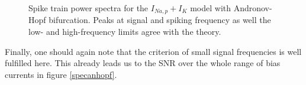 \documentclass[12pt,a4paper]{article}
\begin{document}
\begin{figure}[H]
	\label{anhopfspec}
	\hspace*{-0.5cm}
	\caption{Spike train power spectra for the $I_{Na,p}+I_K$ model with Andronov-Hopf bifurcation. Peaks at signal and spiking frequency as well the low- and high-frequency limits agree with the theory.}
\end{figure}
Finally, one should again note that the criterion of small signal frequencies is well fulfilled here. This already leads us to the SNR over the whole range of bias currents in figure \ref{specanhopf}.
\end{document}
